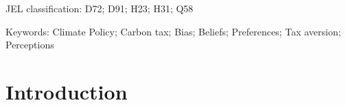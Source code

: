 \documentclass[11pt]{article}
\begin{document}


JEL classification: D72; D91; H23; H31; Q58

Keywords: Climate Policy; Carbon tax; Bias; Beliefs; Preferences; Tax aversion; Perceptions %

\newpage

\newpage
\section{Introduction}


\end{document}
